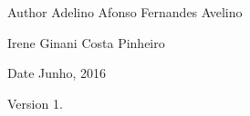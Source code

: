 \begin{DoxyAuthor}{Author}
Adelino Afonso Fernandes Avelino 

Irene Ginani Costa Pinheiro 
\end{DoxyAuthor}
\begin{DoxyDate}{Date}
Junho, 2016 
\end{DoxyDate}
\begin{DoxyVersion}{Version}
1. 
\end{DoxyVersion}
